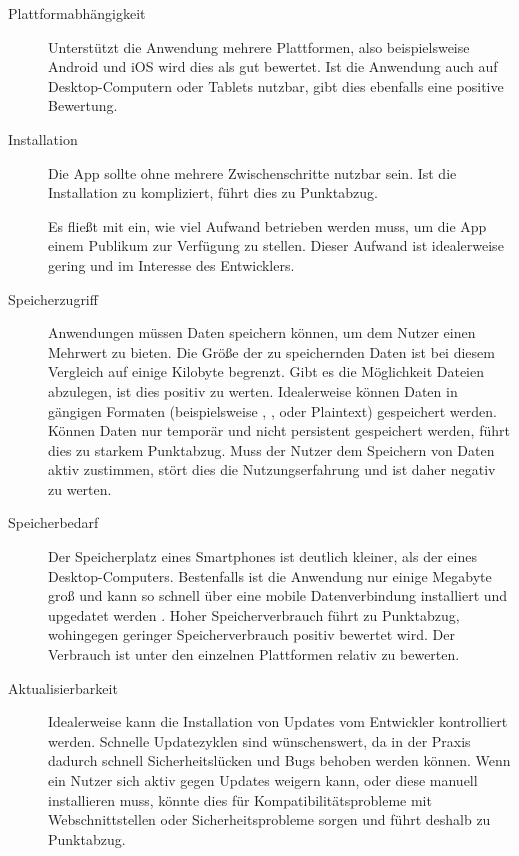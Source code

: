 \begin{description}
	\item [Plattformabhängigkeit] 
		  Unterstützt die Anwendung mehrere Plattformen, also beispielsweise Android und iOS wird dies als gut bewertet. Ist die Anwendung auch auf Desktop-Computern oder Tablets nutzbar, gibt dies ebenfalls eine positive Bewertung.
		  
	\item [Installation]
	      Die App sollte ohne mehrere Zwischenschritte nutzbar sein. Ist die Installation zu kompliziert, führt dies zu Punktabzug.

	      Es fließt mit ein, wie viel Aufwand betrieben werden muss, um die App einem Publikum zur Verfügung zu stellen. Dieser Aufwand ist idealerweise gering und im Interesse des Entwicklers.

	\item [Speicherzugriff]
	      Anwendungen müssen Daten speichern können, um dem Nutzer einen Mehrwert zu bieten. Die Größe der zu speichernden Daten ist bei diesem Vergleich auf einige Kilobyte begrenzt. Gibt es die Möglichkeit Dateien abzulegen, ist dies positiv zu werten. Idealerweise können Daten in gängigen Formaten (beispielsweise , ,  oder Plaintext) gespeichert werden.
	      Können Daten nur temporär und nicht persistent gespeichert werden, führt dies zu starkem Punktabzug. Muss der Nutzer dem Speichern von Daten aktiv zustimmen, stört dies die Nutzungserfahrung und ist daher negativ zu werten.

	\item [Speicherbedarf]
	      Der Speicherplatz eines Smartphones ist deutlich kleiner, als der eines Desktop-Computers. Bestenfalls ist die Anwendung nur einige Megabyte groß und kann so schnell über eine mobile Datenverbindung installiert und upgedatet werden \cite{AppleMaxAppSize} \cite{GoogleMaxAppSize}. 
	      Hoher Speicherverbrauch führt zu Punktabzug, wohingegen geringer Speicherverbrauch positiv bewertet wird. Der Verbrauch ist unter den einzelnen Plattformen relativ zu bewerten.

	\item [Aktualisierbarkeit]
	      Idealerweise kann die Installation von Updates vom Entwickler kontrolliert werden. Schnelle Updatezyklen sind wünschenswert, da in der Praxis dadurch schnell Sicherheitslücken und Bugs behoben werden können. Wenn ein Nutzer sich aktiv gegen Updates weigern kann, oder diese manuell installieren muss, könnte dies für Kompatibilitätsprobleme mit Webschnittstellen oder Sicherheitsprobleme sorgen und führt deshalb zu Punktabzug.


\end{description}

